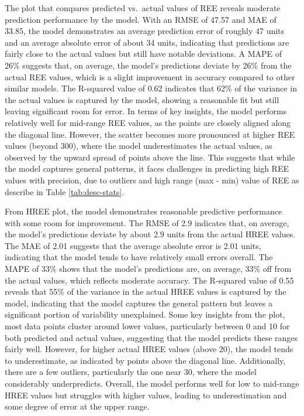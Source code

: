 \documentclass[11pt,a4paper,]{article}
\begin{document}
The plot that compares predicted vs.~actual values of REE reveals moderate prediction performance by the model. With an RMSE of 47.57 and MAE of 33.85, the model demonstrates an average prediction error of roughly 47 units and an average absolute error of about 34 units, indicating that predictions are fairly close to the actual values but still have notable deviations. A MAPE of 26\% suggests that, on average, the model's predictions deviate by 26\% from the actual REE values, which is a slight improvement in accuracy compared to other similar models. The R-squared value of 0.62 indicates that 62\% of the variance in the actual values is captured by the model, showing a reasonable fit but still leaving significant room for error. In terms of key insights, the model performs relatively well for mid-range REE values, as the points are closely aligned along the diagonal line. However, the scatter becomes more pronounced at higher REE values (beyond 300), where the model underestimates the actual values, as observed by the upward spread of points above the line. This suggests that while the model captures general patterns, it faces challenges in predicting high REE values with precision, due to outliers and high range (max - min) value of REE as describe in Table \ref{tab:desc-stats}.

From HREE plot, the model demonstrates reasonable predictive performance with some room for improvement. The RMSE of 2.9 indicates that, on average, the model's predictions deviate by about 2.9 units from the actual HREE values. The MAE of 2.01 suggests that the average absolute error is 2.01 units, indicating that the model tends to have relatively small errors overall. The MAPE of 33\% shows that the model's predictions are, on average, 33\% off from the actual values, which reflects moderate accuracy. The R-squared value of 0.55 reveals that 55\% of the variance in the actual HREE values is captured by the model, indicating that the model captures the general pattern but leaves a significant portion of variability unexplained. Some key insights from the plot, most data points cluster around lower values, particularly between 0 and 10 for both predicted and actual values, suggesting that the model predicts these ranges fairly well. However, for higher actual HREE values (above 20), the model tends to underestimate, as indicated by points above the diagonal line. Additionally, there are a few outliers, particularly the one near 30, where the model considerably underpredicts. Overall, the model performs well for low to mid-range HREE values but struggles with higher values, leading to underestimation and some degree of error at the upper range.
\end{document}
